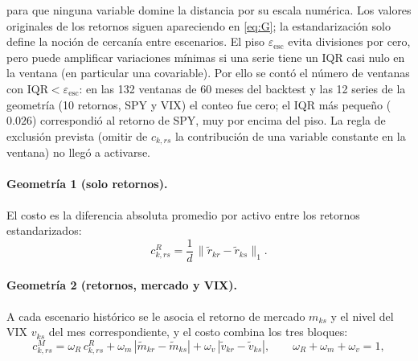 para que ninguna variable domine la distancia por su escala numérica. Los valores originales de los retornos siguen apareciendo en \eqref{eq:G}; la estandarización solo define la noción de cercanía entre escenarios. El piso $\varepsilon_{\mathrm{esc}}$ evita divisiones por cero, pero puede amplificar variaciones mínimas si una serie tiene un IQR casi nulo en la ventana (en particular una covariable). 
Por ello se contó el número de ventanas con $\mathrm{IQR}<\varepsilon_{\mathrm{esc}}$: en las 132 ventanas de 60 meses del backtest y las 12 series de la geometría (10 retornos, SPY y VIX) el conteo fue cero; el IQR más pequeño ($0.026$) correspondió al retorno de SPY, muy por encima del piso. La regla de exclusión prevista (omitir de $c_{k,rs}$ la contribución de una variable constante en la ventana) no llegó a activarse.



\paragraph{Geometría 1 (solo retornos).} El costo es la diferencia absoluta promedio por activo entre los retornos estandarizados:
\begin{equation}\label{eq:g1}
c^{R}_{k,rs}=\frac1d\,\bigl\|\tilde r_{kr}-\tilde r_{ks}\bigr\|_1 .
\end{equation}

\paragraph{Geometría 2 (retornos, mercado y VIX).} A cada escenario histórico se le asocia el retorno de mercado $m_{ks}$ y el nivel del VIX $v_{ks}$ del mes correspondiente, y el costo combina los tres bloques:
\begin{equation}\label{eq:g2}
c^{M}_{k,rs}=\omega_R\,c^{R}_{k,rs}+\omega_m\,|\tilde m_{kr}-\tilde m_{ks}|+\omega_v\,|\tilde v_{kr}-\tilde v_{ks}|,\qquad \omega_R+\omega_m+\omega_v=1,
\end{equation}

